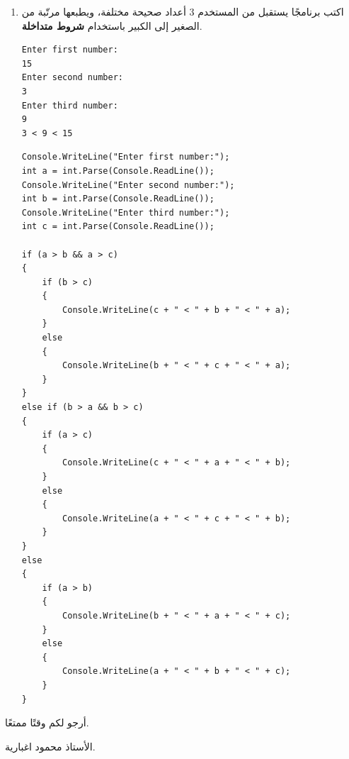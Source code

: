 \documentclass[14pt]{extarticle}
\begin{document}
\begin{enumerate}[resume, itemsep=2em]
\filbreak
\item
اكتب برنامجًا يستقبل من المستخدم 3 أعداد صحيحة مختلفة، ويطبعها مرتّبة من الصغير إلى الكبير باستخدام \textbf{شروط متداخلة}.
\ifdetailed
\begin{boxExample}[1]
\begin{english}
\begin{verbatim}
Enter first number:
15
Enter second number:
3
Enter third number:
9
3 < 9 < 15
\end{verbatim}
\end{english}
\end{boxExample}
\fi
\ifwithsols
\begin{boxSolution}
\begin{english}
\begin{verbatim}
Console.WriteLine("Enter first number:");
int a = int.Parse(Console.ReadLine());
Console.WriteLine("Enter second number:");
int b = int.Parse(Console.ReadLine());
Console.WriteLine("Enter third number:");
int c = int.Parse(Console.ReadLine());

if (a > b && a > c)
{
    if (b > c)
    {
        Console.WriteLine(c + " < " + b + " < " + a);
    }
    else
    {
        Console.WriteLine(b + " < " + c + " < " + a);
    }
}
else if (b > a && b > c)
{
    if (a > c)
    {
        Console.WriteLine(c + " < " + a + " < " + b);
    }
    else
    {
        Console.WriteLine(a + " < " + c + " < " + b);
    }
}
else
{
    if (a > b)
    {
        Console.WriteLine(b + " < " + a + " < " + c);
    }
    else
    {
        Console.WriteLine(a + " < " + b + " < " + c);
    }
}
\end{verbatim}
\end{english}
\end{boxSolution}
\fi

\end{enumerate}

\vspace{1cm}
\begin{flushleft}
أرجو لكم وقتًا ممتعًا.

الأستاذ محمود اغبارية.
\end{flushleft}
\end{document}
